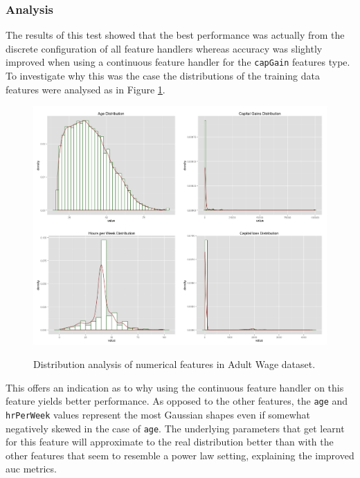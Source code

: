 \documentclass[a4paper,11pt]{scrreprt}
\begin{document}
\subsubsection{Analysis}
The results of this test showed that the best performance was actually from the discrete configuration of all feature handlers whereas accuracy was slightly improved when using a continuous feature handler for the \verb|capGain| features type. To investigate why this was the case the distributions of the training data features were analysed as in Figure \ref{fig:adultwagefeaturedist}. 
\begin{figure}[h!]
\centering
\caption{Distribution analysis of numerical features in Adult Wage dataset.}
\includegraphics[scale=0.37, trim=0 0 0 0, clip=true] {AdultWageFeatureDistributions.png}
\label{fig:adultwagefeaturedist}
\end{figure}

This offers an indication as to why using the continuous feature handler on this feature yields better performance. As opposed to the other features, the \verb|age| and \verb|hrPerWeek| values represent the most Gaussian shapes even if somewhat negatively skewed in the case of \verb|age|. The underlying parameters that get learnt for this feature will approximate to the real distribution better than with the other features that seem to resemble a power law setting, explaining the improved \acrshort{auc} metrics.\\
\end{document}
